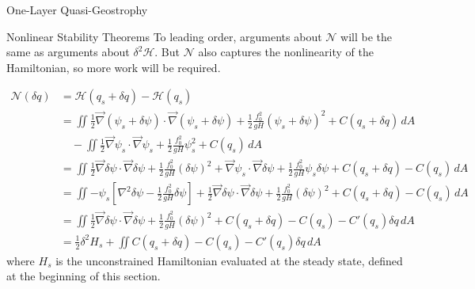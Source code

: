 \documentclass[12pt]{article}
\begin{document}
\begin{section}{One-Layer Quasi-Geostrophy}
\begin{subsection}{Nonlinear Stability Theorems}
        To leading order, arguments about $\mathcal{N}$ will be the same as arguments about $\delta^2 \mathcal{H}$. But $\mathcal{N}$ also captures the nonlinearity of the Hamiltonian, so more work will be required.

        \begin{align*}
            \mathcal{N}(\delta q)
            &= \mathcal{H}(q_s + \delta q) - \mathcal{H}(q_s) \\
            &= \iint  \frac12 \vec\nabla(\psi_s + \delta \psi) \cdot \vec\nabla(\psi_s + \delta \psi) + \frac12 \frac{f_0^2}{g H} (\psi_s + \delta \psi)^2 + C(q_s + \delta q) \, dA \\
            &\quad - \iint  \frac12 \vec\nabla\psi_s \cdot \vec\nabla\psi_s + \frac12 \frac{f_0^2}{g H} \psi_s^2 + C(q_s) \, dA \\
            &= \iint \frac12 \vec\nabla\delta\psi \cdot \vec\nabla\delta\psi + \frac12 \frac{f_0^2}{g H} (\delta \psi)^2 + \vec\nabla\psi_s \cdot \vec\nabla\delta\psi + \frac12 \frac{f_0^2}{g H} \psi_s\delta\psi + C(q_s + \delta q) - C(q_s) \, dA \\
            &= \iint -\psi_s \left[ \nabla^2\delta\psi - \frac12 \frac{f_0^2}{g H} \delta\psi \right] + \frac12 \vec\nabla\delta\psi \cdot \vec\nabla\delta\psi + \frac12 \frac{f_0^2}{g H}(\delta\psi)^2 + C(q_s + \delta q) - C(q_s) \, dA \\
            &= \iint \frac12 \vec\nabla\delta\psi \cdot \vec\nabla\delta\psi + \frac12 \frac{f_0^2}{g H}(\delta \psi)^2 + C(q_s + \delta q) - C(q_s) -C'(q_s)\delta q\, dA \\
            &= \frac12 \delta^2 H_s + \iint C(q_s + \delta q) - C(q_s) -C'(q_s)\delta q\, dA
        \end{align*}
        where $H_s$ is the unconstrained Hamiltonian evaluated at the steady state, defined at the beginning of this section.
    \end{subsection}
\end{section}
\end{document}
